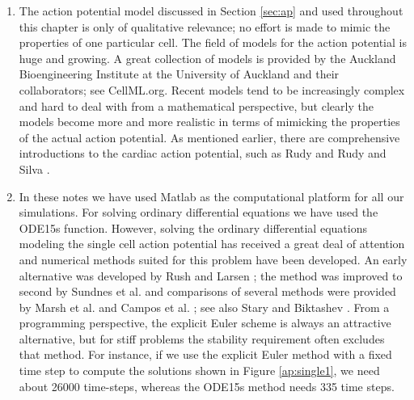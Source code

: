 \begin{enumerate}
\item The action potential model discussed in Section \ref{sec:ap} and used throughout this chapter is only of qualitative relevance; no effort is made to mimic the properties of one particular cell. The field of models for the action potential is huge and growing. A great collection of models is provided by the Auckland Bioengineering Institute at the University of Auckland and their collaborators; see CellML.org. Recent models tend to be increasingly complex and hard to deal with from a mathematical perspective, but clearly the models become more and more realistic in terms of mimicking the properties of the actual action potential.  As mentioned earlier, there are comprehensive introductions to the cardiac action potential, such as Rudy \cite{Rudy2012} and Rudy and Silva \cite{Rudy2006}.
\item In these notes we have used Matlab as the computational platform for all our simulations. For solving ordinary differential equations we have used the ODE15s function. However, solving the ordinary differential equations modeling the single cell action potential has received a great deal of attention and numerical methods suited for this problem have been developed. An early alternative was developed by Rush and Larsen \cite{Rush1978}; the method was improved to second by Sundnes et al.  \cite{Sundnes2009} and comparisons of several methods were provided by Marsh et al. \cite{Marsh2012} and Campos et al. \cite{Campos2013}; see also Stary and Biktashev \cite{Stary2015}. From a programming perspective, the explicit Euler scheme is always an attractive alternative, but for stiff problems the stability requirement often excludes that method. For instance, if we use the explicit Euler method with a fixed time step to compute the solutions shown in  Figure \ref{ap:single1}, we need about 26000 time-steps, whereas the ODE15s method needs 335 time steps.

\end{enumerate}
